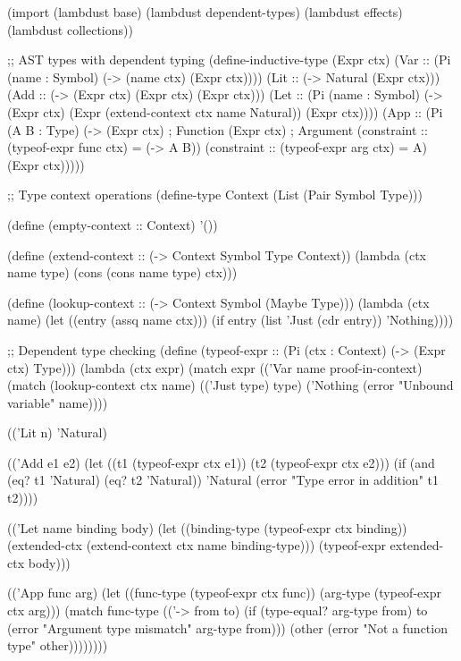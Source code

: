 \begin{example}
\begin{lambdustcode}
(import (lambdust base)
        (lambdust dependent-types)
        (lambdust effects)
        (lambdust collections))

;; AST types with dependent typing
(define-inductive-type (Expr ctx)
  (Var :: (Pi (name : Symbol) (-> (name \in ctx) (Expr ctx))))
  (Lit :: (-> Natural (Expr ctx)))
  (Add :: (-> (Expr ctx) (Expr ctx) (Expr ctx)))
  (Let :: (Pi (name : Symbol) (-> (Expr ctx) 
                                  (Expr (extend-context ctx name Natural))
                                  (Expr ctx))))
  (App :: (Pi (A B : Type) (-> (Expr ctx)  ; Function
                               (Expr ctx)  ; Argument  
                               (constraint :: (typeof-expr func ctx) = (-> A B))
                               (constraint :: (typeof-expr arg ctx) = A)
                               (Expr ctx)))))

;; Type context operations
(define-type Context (List (Pair Symbol Type)))

(define (empty-context :: Context) '())

(define (extend-context :: (-> Context Symbol Type Context))
  (lambda (ctx name type)
    (cons (cons name type) ctx)))

(define (lookup-context :: (-> Context Symbol (Maybe Type)))
  (lambda (ctx name)
    (let ((entry (assq name ctx)))
      (if entry (list 'Just (cdr entry)) 'Nothing))))

;; Dependent type checking
(define (typeof-expr :: (Pi (ctx : Context) 
                           (-> (Expr ctx) Type)))
  (lambda (ctx expr)
    (match expr
      (('Var name proof-in-context)
       (match (lookup-context ctx name)
         (('Just type) type)
         ('Nothing (error "Unbound variable" name))))
      
      (('Lit n)
       'Natural)
      
      (('Add e1 e2)
       (let ((t1 (typeof-expr ctx e1))
             (t2 (typeof-expr ctx e2)))
         (if (and (eq? t1 'Natural) (eq? t2 'Natural))
             'Natural
             (error "Type error in addition" t1 t2))))
      
      (('Let name binding body)
       (let ((binding-type (typeof-expr ctx binding))
             (extended-ctx (extend-context ctx name binding-type)))
         (typeof-expr extended-ctx body)))
      
      (('App func arg)
       (let ((func-type (typeof-expr ctx func))
             (arg-type (typeof-expr ctx arg)))
         (match func-type
           (('-> from to)
            (if (type-equal? arg-type from)
                to
                (error "Argument type mismatch" arg-type from)))
           (other
            (error "Not a function type" other))))))))


\end{lambdustcode}
\end{example}
